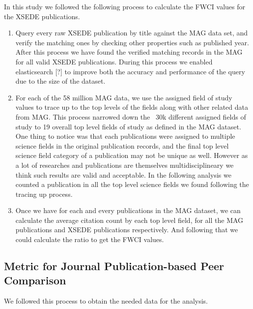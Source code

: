 \documentclass{sig-alternate}
\begin{document}
In this study we followed the following process to calculate the FWCI values for the
XSEDE publications.

\begin{enumerate}
\item Query every raw XSEDE publication by title against the MAG data set,
and verify the matching ones by checking other properties such as published year. After this
process we have found the verified matching records in the MAG for all valid XSEDE publications.
During this process we enabled elasticsearch [?] to improve both the accuracy and performance
of the query due to the size of the dataset.
\item For each of the 58 million MAG data, we use the assigned field of study values to trace up
to the top levels of the fields along with other related data from MAG. This process narrowed
down the ~30k different assigned fields of study to 19 overall top level fields of study as
defined in the MAG dataset.
One thing to notice was that each publications were assigned to multiple science fields in the
original publication records, and the final top level science field category of a publication
may not be unique as well. However as a lot of researches and publications are themselves
multidisciplineary we think such results are valid and acceptable. In the following analysis
we counted a publication in all the top level science fields we found following the tracing
up process.
\item Once we have for each and every publications in the MAG dataset, we can calculate the average
citation count by each top level field, for all the MAG publications and XSEDE publications
respectively. And following that we could calculate the ratio to get the FWCI values.
\end{enumerate}

\subsection{Metric for Journal Publication-based Peer Comparison} \label{S:metric}

We followed this process to obtain the needed data for the analysis.
\end{document}
